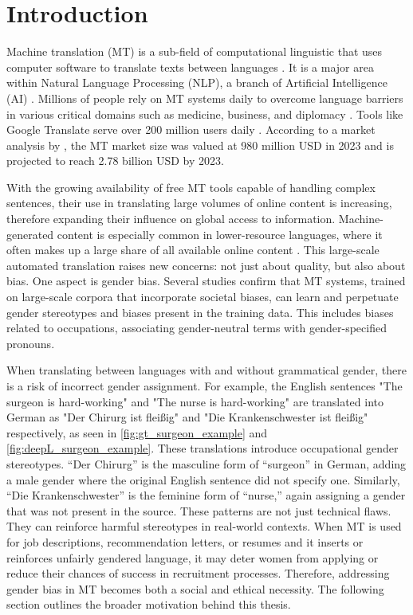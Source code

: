 \chapter{Introduction}
Machine translation (MT) is a sub-field of computational linguistic that uses computer software to translate texts between languages \citep{linMachineTranslationAcademic2009}. It is a major area within Natural Language Processing (NLP), a branch of Artificial Intelligence (AI) \citep{smacchiaDoesAIReflect2024}. Millions of people rely on MT systems daily to overcome language barriers in various critical domains such as medicine, business, and diplomacy \citep{kapplAreAllSpanish2025}. Tools like Google Translate serve over 200 million users daily \citep{pratesAssessingGenderBias2019,shresthaExploringGenderBiases2022}. According to a market analysis by \citet{skyquestMachineTranslationMT2025}, the MT market size was valued at 980 million USD in 2023 and is projected to reach 2.78 billion USD by 2023. 

With the growing availability of free MT tools capable of handling complex sentences, their use in translating large volumes of online content is increasing, therefore expanding their influence on global access to information. Machine-generated content is especially common in lower-resource languages, where it often makes up a large share of all available online content \citep{thompsonShockingAmountWeb2024}. This large-scale automated translation raises new concerns: not just about quality, but also about bias. One aspect is gender bias. Several studies \citep{smacchiaDoesAIReflect2024,choMeasuringGenderBias2019,stanczakSurveyGenderBias2021,soundararajanInvestigatingGenderBias2024} confirm that MT systems, trained on large-scale corpora that incorporate societal biases, can learn and perpetuate gender stereotypes and biases present in the training data. This includes biases related to occupations, associating gender-neutral terms with gender-specified pronouns.

When translating between languages with and without grammatical gender, there is a risk of incorrect gender assignment. For example, the English sentences "The surgeon is hard-working" and "The nurse is hard-working" are translated into German as "Der Chirurg ist fleißig" and "Die Krankenschwester ist fleißig" respectively, as seen in \autoref{fig:gt_surgeon_example} and \autoref{fig:deepL_surgeon_example}. These translations introduce occupational gender stereotypes. “Der Chirurg” is the masculine form of “surgeon” in German, adding a male gender where the original English sentence did not specify one. Similarly, “Die Krankenschwester” is the feminine form of “nurse,” again assigning a gender that was not present in the source. These patterns are not just technical flaws. They can reinforce harmful stereotypes in real-world contexts. When MT is used for job descriptions, recommendation letters, or resumes \citep{bolukbasiManComputerProgrammer2016} and it inserts or reinforces unfairly gendered language, it may deter women from applying or reduce their chances of success in recruitment processes. Therefore, addressing gender bias in MT becomes both a social and ethical necessity. The following section outlines the broader motivation behind this thesis.



